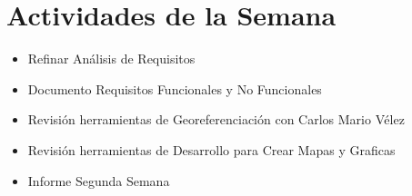 \section{Actividades de la Semana}


\begin{itemize}

\item Refinar Análisis de Requisitos

\item Documento Requisitos Funcionales y No Funcionales

\item Revisión herramientas de Georeferenciación con Carlos Mario Vélez

\item Revisión herramientas de Desarrollo para Crear Mapas y Graficas

\item Informe Segunda Semana

\end{itemize}
